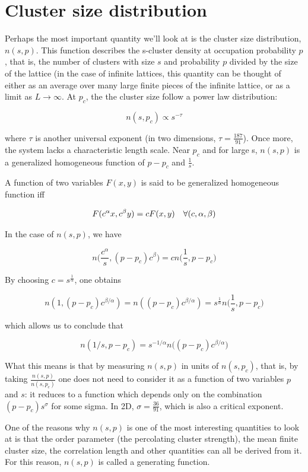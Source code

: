 \section{Cluster size distribution} 

Perhaps the most important quantity we'll look at is the cluster size distribution, $n(s, p)$. This function describes the s-cluster density at occupation probability $p$, that is, the number of clusters with size $s$ and probability $p$ divided by the size of the lattice (in the case of infinite lattices, this quantity can be thought of either as an average over many large finite pieces of the infinite lattice, or as a limit as $L \rightarrow \infty$. At $p_c$, the the cluster size follow a power law distribution:

$$
    n(s, p_c) \propto s^{-\tau}
$$

where $\tau$ is another universal exponent (in two dimensions, $\tau = \frac{187}{91}$). Once more, the system lacks a characteristic length scale. 
Near $p_c$ and for large s, $n(s, p)$ is a generalized homogeneous function of $p - p_c$ and $\frac{1}{s}$. 

A function of two variables $F(x, y)$ is said to be generalized homogeneous function iff 

$$ 
F(c^\alpha x, c^\beta y) = c F(x, y) \hspace{0.35cm} \forall (c, \alpha, \beta)
$$

In the case of $n(s, p)$, we have 

$$
    n\bigg(\frac{c^\alpha}{s}, (p-p_c)c^\beta\bigg) = c n\bigg(\frac{1}{s}, p-p_c\bigg)
$$


By choosing $c = s^\frac{1}{\alpha}$, one obtains 


$$ 
n(1, (p-p_c) c^{\beta / \alpha}) =  n((p-p_c) c^{\beta / \alpha}) = s^\frac{1}{\alpha}n\bigg(\frac{1}{s}, p-p_c\bigg)
$$ 

which allows us to conclude that 

$$ 
n(1/s, p - p_c) = s^{-1/\alpha} n\big((p - p_c) c^{\beta / \alpha}\big)
$$ 

What this means is that by measuring $n(s, p)$ in units of $n(s, p_c)$, that is, by taking $\frac{n(s, p)}{n(s, p_c)}$ one does not need to consider it as a function of two variables $p$ and $s$: it reduces to a function which depends only on the combination $(p - p_c)s^\sigma$ for some sigma. In 2D, $\sigma = \frac{36}{91}$, which is also a critical exponent. 


One of the reasons why $n(s, p)$ is one of the most interesting quantities to look at is that the order parameter (the percolating cluster strength), the mean finite cluster size, the correlation length and other quantities can all be derived from it. For this reason, $n(s, p)$ is called a generating function.

